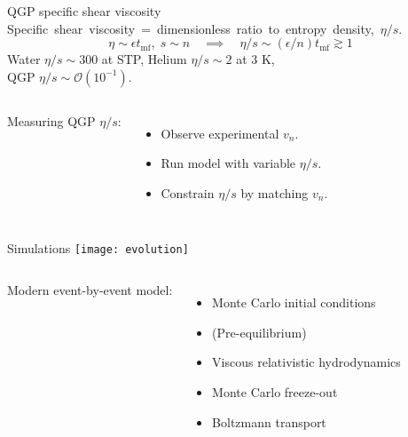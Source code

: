 \documentclass{beamer}
\begin{document}
\begin{frame}{QGP specific shear viscosity}
  \hspace{-1ex}\mbox{Specific shear viscosity = dimensionless ratio to entropy density, $\eta/s$.}
  \begin{equation*}
    \eta \sim \epsilon t_\text{mf}, \;
    s \sim n \quad \implies \quad
    \eta/s \sim (\epsilon/n) t_\text{mf} \gtrsim 1
  \end{equation*}
  Water $\eta/s \sim 300$ at STP, Helium $\eta/s \sim 2$ at 3 K, \\
  QGP $\eta/s \sim \mathcal O(10^{-1})$.
  
  \vspace{2em}

  \begin{columns}

    Measuring QGP $\eta/s$:
    \begin{itemize}
      \item Observe experimental $v_n$.
      \item Run model with variable $\eta/s$.
      \item Constrain $\eta/s$ by matching $v_n$.
    \end{itemize}
  \end{columns}

\end{frame}


\begin{frame}{Simulations}
  \texttt{[image: evolution]} \\[3ex]
  \begin{columns}
    Modern event-by-event model:
    \begin{itemize}
      \item Monte Carlo initial conditions
      \item (Pre-equilibrium)
      \item Viscous relativistic hydrodynamics
      \item Monte Carlo freeze-out
      \item Boltzmann transport
    \end{itemize}
  \end{columns}
\end{frame}
\end{document}
